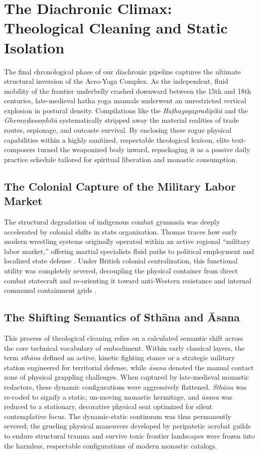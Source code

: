 \documentclass[11pt,twoside,letterpaper]{article}
\begin{document}
\section{The Diachronic Climax: Theological Cleaning and Static Isolation}

The final chronological phase of our diachronic pipeline captures the ultimate structural inversion of the Acro-Yoga Complex. As the independent, fluid mobility of the frontier underbelly crashed downward between the 15th and 18th centuries, late-medieval hatha yoga manuals underwent an unrestricted vertical explosion in postural density. Compilations like the \textit{Haṭhayogapradīpikā} and the \textit{Gheraṇḍasaṃhitā} systematically stripped away the material realities of trade routes, espionage, and outcaste survival. By enclosing these rogue physical capabilities within a highly sanitized, respectable theological lexicon, elite text-composers turned the weaponized body inward, repackaging it as a passive daily practice schedule tailored for spiritual liberation and monastic consumption.

\subsection{The Colonial Capture of the Military Labor Market}
The structural degradation of indigenous combat gymnasia was deeply accelerated by colonial shifts in state organization. Thomas traces how early modern wrestling systems originally operated within an active regional ``military labor market,'' offering martial specialists fluid paths to political employment and localized state defense \cite{Thomas2025}. Under British colonial centralization, this functional utility was completely severed, decoupling the physical container from direct combat statecraft and re-orienting it toward anti-Western resistance and internal communal containment grids \cite{Thomas2025}.

\subsection{The Shifting Semantics of Sthāna and Āsana}

This process of theological cleaning relies on a calculated semantic shift across the core technical vocabulary of embodiment. Within early classical layers, the term \textit{sthāna} defined an active, kinetic fighting stance or a strategic military station engineered for territorial defense, while \textit{āsana} denoted the manual contact zone of physical grappling challenges. When captured by late-medieval monastic redactors, these dynamic configurations were aggressively flattened. \textit{Sthāna} was re-coded to signify a static, un-moving monastic hermitage, and \textit{āsana} was reduced to a stationary, decorative physical seat optimized for silent contemplative focus. The dynamic-static continuum was thus permanently severed; the grueling physical maneuvers developed by peripatetic acrobat guilds to endure structural trauma and survive toxic frontier landscapes were frozen into the harmless, respectable configurations of modern monastic catalogs.
\end{document}
